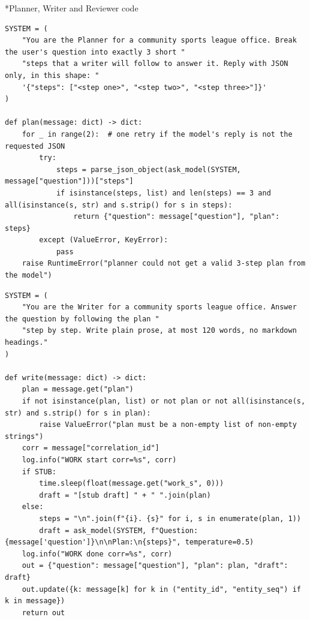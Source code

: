 \documentclass[11pt]{article}
\makeatletter
\renewcommand\subsection{\@startsection{subsection}{2}{\z@}{-2.2ex \@plus -1ex \@minus -.2ex}{0.8ex \@plus.2ex}{\normalfont\fontsize{12}{14.5}\selectfont\bfseries}}
\makeatother
\begin{document}
\subsection*{Planner, Writer and Reviewer code}
\begingroup\lstset{basicstyle=\ttfamily\tiny}
\begin{lstlisting}
SYSTEM = (
    "You are the Planner for a community sports league office. Break the user's question into exactly 3 short "
    "steps that a writer will follow to answer it. Reply with JSON only, in this shape: "
    '{"steps": ["<step one>", "<step two>", "<step three>"]}'
)

def plan(message: dict) -> dict:
    for _ in range(2):  # one retry if the model's reply is not the requested JSON
        try:
            steps = parse_json_object(ask_model(SYSTEM, message["question"]))["steps"]
            if isinstance(steps, list) and len(steps) == 3 and all(isinstance(s, str) and s.strip() for s in steps):
                return {"question": message["question"], "plan": steps}
        except (ValueError, KeyError):
            pass
    raise RuntimeError("planner could not get a valid 3-step plan from the model")
\end{lstlisting}
\endgroup
\begingroup\lstset{basicstyle=\ttfamily\tiny}
\begin{lstlisting}
SYSTEM = (
    "You are the Writer for a community sports league office. Answer the question by following the plan "
    "step by step. Write plain prose, at most 120 words, no markdown headings."
)

def write(message: dict) -> dict:
    plan = message.get("plan")
    if not isinstance(plan, list) or not plan or not all(isinstance(s, str) and s.strip() for s in plan):
        raise ValueError("plan must be a non-empty list of non-empty strings")
    corr = message["correlation_id"]
    log.info("WORK start corr=%s", corr)
    if STUB:
        time.sleep(float(message.get("work_s", 0)))
        draft = "[stub draft] " + " ".join(plan)
    else:
        steps = "\n".join(f"{i}. {s}" for i, s in enumerate(plan, 1))
        draft = ask_model(SYSTEM, f"Question: {message['question']}\n\nPlan:\n{steps}", temperature=0.5)
    log.info("WORK done corr=%s", corr)
    out = {"question": message["question"], "plan": plan, "draft": draft}
    out.update({k: message[k] for k in ("entity_id", "entity_seq") if k in message})
    return out
\end{lstlisting}
\endgroup
\begingroup\lstset{basicstyle=\ttfamily\tiny}
\end{document}

